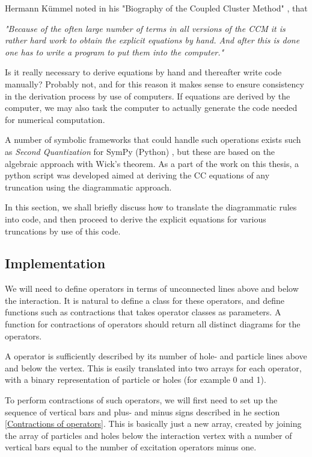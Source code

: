 Hermann Kümmel noted in his "Biography of the Coupled Cluster Method" \cite{Kummel}, that 

\emph{"Because of the often large number of terms in all versions of the CCM it is rather hard work to obtain the explicit equations by hand. And after this is done one has to write a program to put them into the computer."}

Is it really necessary to derive equations by hand and thereafter write code manually? Probably not, and for this reason it makes sense to ensure consistency in the derivation process by use of computers. If equations are derived by the computer, we may also task the computer to actually generate the code needed for numerical computation.

A number of symbolic frameworks that could handle such operations exists such as \emph{Second Quantization} for SymPy (Python) \cite{secondquant}, but these are based on the algebraic approach with Wick's theorem. As a part of the work on this thesis, a python script was developed aimed at deriving the CC equations of any truncation using the diagrammatic approach. 

In this section, we shall briefly discuss how to translate the diagrammatic rules into code, and then proceed to derive the explicit equations for various truncations by use of this code. 

\subsection{Implementation}

We will need to define operators in terms of unconnected lines above and below the interaction. It is natural to define a class for these operators, and define functions such as contractions that takes operator classes as parameters. A function for contractions of operators should return all distinct diagrams for the operators.

A operator is sufficiently described by its number of hole- and particle lines above and below the vertex. This is easily translated into two arrays for each operator, with a binary representation of particle or holes (for example 0 and 1).

To perform contractions of such operators, we will first need to set up the sequence of vertical bars and plus- and minus signs described in he section \ref{Contractions of operators}. This is basically just a new array, created by joining the array of particles and holes below the interaction vertex with a number of vertical bars equal to the number of excitation operators minus one.

